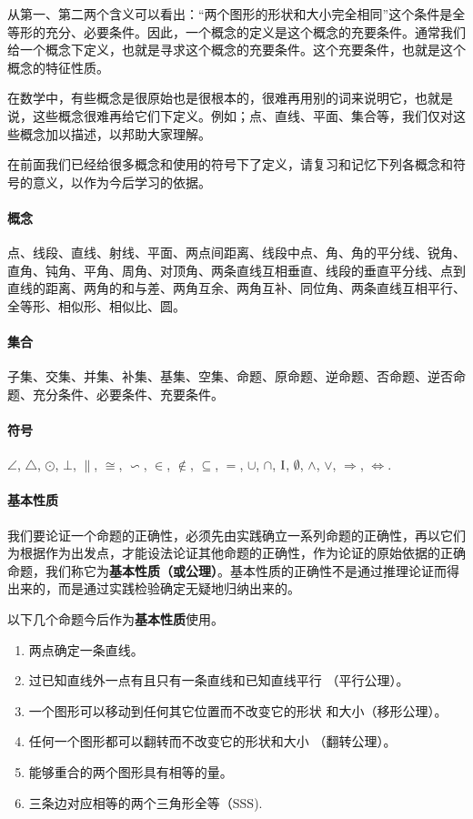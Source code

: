 从第一、第二两个含义可以看出：“两个图形的形状和大小完全相同”这个条件是全等形的充分、必要条件。因此，一个概念的定义是这个概念的充要条件。通常我们给一个概念下定义，也就是寻求这个概念的充要条件。这个充要条件，也就是这个概念的特征性质。

在数学中，有些概念是很原始也是很根本的，很难再用别的词来说明它，也就是说，这些概念很难再给它们下定义。例如；点、直线、平面、集合等，我们仅对这些概念加以描述，以邦助大家理解。

在前面我们已经给很多概念和使用的符号下了定义，请复习和记忆下列各概念和符号的意义，以作为今后学习的依据。

\paragraph{概念} 点、线段、直线、射线、平面、两点间距离、线段中点、角、角的平分线、锐角、直角、钝角、平角、周角、对顶角、两条直线互相垂直、线段的垂直平分线、点到直线的距离、两角的和与差、两角互余、两角互补、同位角、两条直线互相平行、全等形、相似形、相似比、圆。

\paragraph{集合} 子集、交集、并集、补集、基集、空集、命题、原命题、逆命题、否命题、逆否命题、充分条件、必要条件、充要条件。

\paragraph{符号} $\angle$, $\triangle$, $\odot$, $\bot$, $\parallel$, $\cong$, $\backsim$, $\in$, $\notin$, $\subseteq$, $=$, $\cup$, $\cap$, ${\rm I}$, $\emptyset$, $\wedge$, $\vee$, $\Rightarrow$, $\Leftrightarrow$.

\paragraph{基本性质}

我们要论证一个命题的正确性，必须先由实践确立一系列命题的正确性，再以它们为根据作为出发点，才能设法论证其他命题的正确性，作为论证的原始依据的正确命题，我们称它为\textbf{基本性质（或公理）}。基本性质的正确性不是通过推理论证而得出来的，而是通过实践检验确定无疑地归纳出来的。

以下几个命题今后作为\textbf{基本性质}使用。

\begin{enumerate}
\item 两点确定一条直线。
\item 过已知直线外一点有且只有一条直线和已知直线平行
（平行公理）。
\item 一个图形可以移动到任何其它位置而不改变它的形状
和大小（移形公理）。
\item 任何一个图形都可以翻转而不改变它的形状和大小
（翻转公理）。
\item 能够重合的两个图形具有相等的量。
\item  三条边对应相等的两个三角形全等（SSS).
\end{enumerate}

